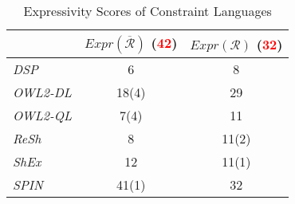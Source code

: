 \documentclass{acm_proc_article-sp}
\newcommand{\tb}[1]{\todo[size=\small, color=green!40]{\textbf{Thomas:} #1}}
\begin{document}
\begin{table}[H]
	\centering
		\caption{Expressivity Scores of Constraint Languages}
	  \scriptsize
		\begin{tabular}{l|c|c}
			\textbf{} & $Expr(\overline{\mathcal{R}})$ (\textcolor{red}{42}) & $Expr(\mathcal{R})$ (\textcolor{red}{32}) \\	
      \hline
			\emph{DSP} & 6 & 8 \\
			\emph{OWL2-DL} & 18(4) & 29 \\ 
			\emph{OWL2-QL} & 7(4) & 11 \\
			\emph{ReSh} & 8 & 11(2) \\
			\emph{ShEx} & 12 & 11(1) \\
			\emph{SPIN} & 41(1)	& 32
		\end{tabular}
	\label{tab:constraint-type-specific-expressivity}
\end{table}
\end{document}

